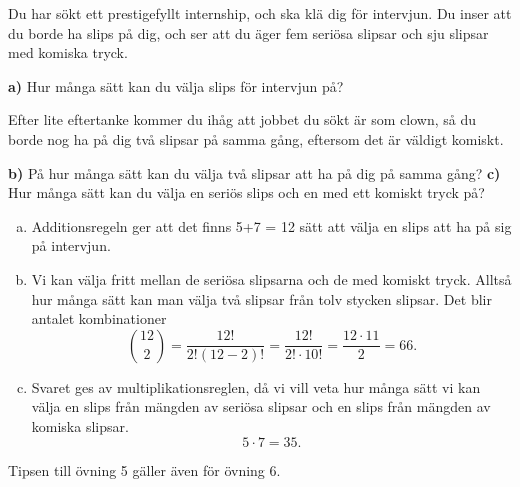 \documentclass{tufte-handout}
\begin{document}
\begin{xca}
	Du har sökt ett prestigefyllt internship, och ska klä dig för intervjun. Du inser att du borde ha slips på dig, och ser att du äger fem seriösa slipsar och sju slipsar med komiska tryck.
  
	\textbf{a)} Hur många sätt kan du välja slips för intervjun på?
  
	Efter lite eftertanke kommer du ihåg att jobbet du sökt är som clown, så du borde nog ha på dig två slipsar på samma gång, eftersom det är väldigt komiskt.

	\textbf{b)} På hur många sätt kan du välja två slipsar att ha på dig på samma gång? \textbf{c)} Hur många sätt kan du välja en seriös slips och en med ett komiskt tryck på?
\end{xca}
\begin{solution}

	\begin{enumerate}[a)]
		\item Additionsregeln ger att det finns 5+7 = 12 sätt att välja en slips att ha på sig på intervjun.
		\item Vi kan välja fritt mellan de seriösa slipsarna och de med komiskt tryck.
		Alltså hur många sätt kan man välja två slipsar från tolv stycken slipsar.
		Det blir antalet kombinationer 
		$$\binom{12}{2} = \frac{12!}{2!(12-2)!} = \frac{12!}{2!\cdot 10!} = \frac{12\cdot 11}{2} = 66.$$
		\item Svaret ges av multiplikationsreglen, då vi vill veta hur många sätt vi kan välja en slips från mängden av seriösa slipsar och en slips från mängden av komiska slipsar.
		$$5\cdot 7 = 35.$$
	\end{enumerate}

	\begin{tips}
		Tipsen till övning 5 gäller även för övning 6.
	\end{tips}
\end{solution} 



\end{document}
